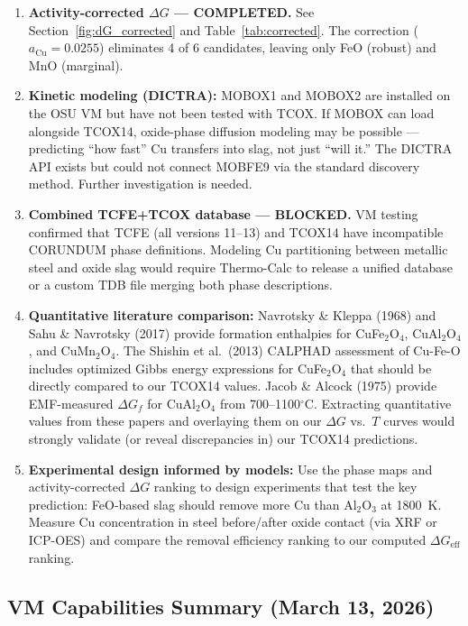 \documentclass[11pt]{article}
\begin{document}
\begin{enumerate}[leftmargin=*]
    \item \textbf{Activity-corrected $\Delta G$ --- COMPLETED.} See Section~\ref{fig:dG_corrected} and Table~\ref{tab:corrected}. The correction ($a_{\text{Cu}} = 0.0255$) eliminates 4 of 6 candidates, leaving only FeO (robust) and MnO (marginal).

    \item \textbf{Kinetic modeling (DICTRA):} MOBOX1 and MOBOX2 are installed on the OSU VM but have not been tested with TCOX. If MOBOX can load alongside TCOX14, oxide-phase diffusion modeling may be possible --- predicting ``how fast'' Cu transfers into slag, not just ``will it.'' The DICTRA API exists but could not connect MOBFE9 via the standard discovery method. Further investigation is needed.

    \item \textbf{Combined TCFE+TCOX database --- BLOCKED.} VM testing confirmed that TCFE (all versions 11--13) and TCOX14 have incompatible CORUNDUM phase definitions. Modeling Cu partitioning between metallic steel and oxide slag would require Thermo-Calc to release a unified database or a custom TDB file merging both phase descriptions.

    \item \textbf{Quantitative literature comparison:} Navrotsky \& Kleppa (1968) and Sahu \& Navrotsky (2017) provide formation enthalpies for CuFe$_2$O$_4$, CuAl$_2$O$_4$, and CuMn$_2$O$_4$. The Shishin et al.\ (2013) CALPHAD assessment of Cu-Fe-O includes optimized Gibbs energy expressions for CuFe$_2$O$_4$ that should be directly compared to our TCOX14 values. Jacob \& Alcock (1975) provide EMF-measured $\Delta G_f$ for CuAl$_2$O$_4$ from 700--1100$^\circ$C. Extracting quantitative values from these papers and overlaying them on our $\Delta G$ vs.\ $T$ curves would strongly validate (or reveal discrepancies in) our TCOX14 predictions.

    \item \textbf{Experimental design informed by models:} Use the phase maps and activity-corrected $\Delta G$ ranking to design experiments that test the key prediction: FeO-based slag should remove more Cu than Al$_2$O$_3$ at \SI{1800}{\kelvin}. Measure Cu concentration in steel before/after oxide contact (via XRF or ICP-OES) and compare the removal efficiency ranking to our computed $\Delta G_{\text{eff}}$ ranking.
\end{enumerate}

\subsection{VM Capabilities Summary (March 13, 2026)}
\end{document}
